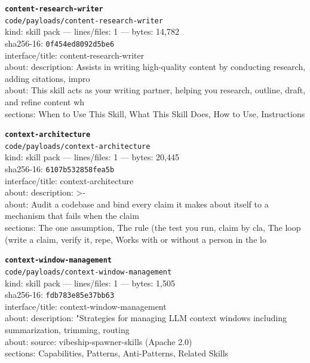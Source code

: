 \noindent\textbf{\texttt{content-research-writer}}\\
\texttt{code/payloads/content-research-writer}\\
kind: skill pack --- lines/files: 1 --- bytes: 14,782\\
sha256-16: \texttt{0f454ed8092d5be6}\\
interface/title: content-research-writer\\
about: description: Assists in writing high-quality content by conducting research, adding citations, impro\\
about: This skill acts as your writing partner, helping you research, outline, draft, and refine content wh\\
sections: When to Use This Skill, What This Skill Does, How to Use, Instructions\\
\vspace*{6.0pt}

\noindent\textbf{\texttt{context-architecture}}\\
\texttt{code/payloads/context-architecture}\\
kind: skill pack --- lines/files: 1 --- bytes: 20,445\\
sha256-16: \texttt{6107b532858fea5b}\\
interface/title: context-architecture\\
about: description: >-\\
about: Audit a codebase and bind every claim it makes about itself to a mechanism that fails when the claim\\
sections: The one assumption, The rule (the test you run, claim by cla, The loop (write a claim, verify it, repe, Works with or without a person in the lo\\
\vspace*{6.0pt}
\newpage

\noindent\textbf{\texttt{context-window-management}}\\
\texttt{code/payloads/context-window-management}\\
kind: skill pack --- lines/files: 1 --- bytes: 1,505\\
sha256-16: \texttt{fdb783e85e37bb63}\\
interface/title: context-window-management\\
about: description: "Strategies for managing LLM context windows including summarization, trimming, routing\\
about: source: vibeship-spawner-skills (Apache 2.0)\\
sections: Capabilities, Patterns, Anti-Patterns, Related Skills\\
\vspace*{6.0pt}

